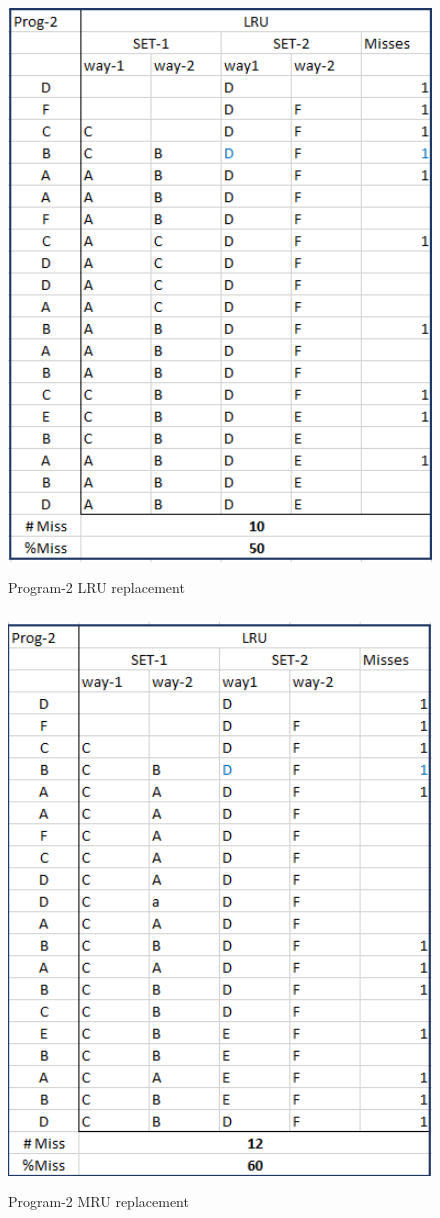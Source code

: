 \documentclass{tufte-handout}
\begin{document}
	\begin{figure}[h!]
	\label{fig:p2lru}
	\centering
	\includegraphics[width = 6in, height = 6in]{p2lru}
	\caption{Program-2 LRU replacement}
	\end{figure}

	
	\begin{figure}[h!]
	\label{fig:p2mru}
	\centering
	\includegraphics[width = 6in, height = 6in]{p2mru}
	\caption{Program-2 MRU replacement}
	\end{figure}
\end{document}
